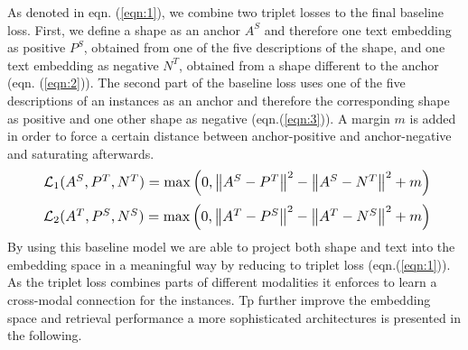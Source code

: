 \documentclass[10pt,twocolumn,letterpaper]{article}
\begin{document}
As denoted in eqn. (\ref{eqn:1}), we combine two triplet losses to the final baseline loss. First, we define a shape as an anchor $A^S$ and therefore one text embedding as positive $P^S$, obtained from one of the five descriptions of the shape, and one text embedding as negative $N^T$, obtained from a shape different to the anchor (eqn. (\ref{eqn:2})). The second part of the baseline loss uses one of the five descriptions of an instances as an anchor and therefore the corresponding shape as positive and one other shape as negative (eqn.(\ref{eqn:3})). A margin $m$ is added in order to force a certain distance between anchor-positive and anchor-negative and saturating afterwards. 
\begin{equation}
	\label{eqn:2}
	\resizebox{.9 \linewidth}{!}
	{ $
	\mathcal{L}_1(A^S, P^T, N^T) = \max \left( 0, \left\Vert A^S - P^T\right\Vert^2 - \left\Vert A^S - N^T\right\Vert^2 +m \right) $}
\end{equation}
\begin{equation}
\label{eqn:3}
\resizebox{.9 \linewidth}{!}
{ $
	\mathcal{L}_2(A^T, P^S, N^S) = \max \left( 0, \left\Vert A^T - P^S\right\Vert^2 - \left\Vert A^T - N^S\right\Vert^2 +m \right) $}
\end{equation}
By using this baseline model we are able to project both shape and text into the embedding space in a meaningful way by reducing to triplet loss (eqn.(\ref{eqn:1})). As the triplet loss combines parts of different modalities it enforces to learn a cross-modal connection for the instances. Tp further improve the embedding space and retrieval performance a more sophisticated architectures is presented in the following.
\end{document}
